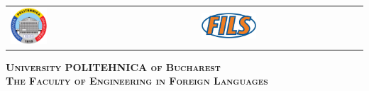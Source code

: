 



\begin{titlepage}
	\centering
	\begin{tabular}{p{5cm}p{5.6cm}}
		\includegraphics[width=0.2\textwidth]{img/upb.png} &
		\includegraphics[width=0.35\textwidth]{img/fils.png}
	\end{tabular}
	\vspace{1cm}

	{\scshape\Large \textbf{University POLITEHNICA of Bucharest} \\}
	{\scshape\Large \textbf{The Faculty of Engineering in Foreign Languages} \\}
	
\end{titlepage}

